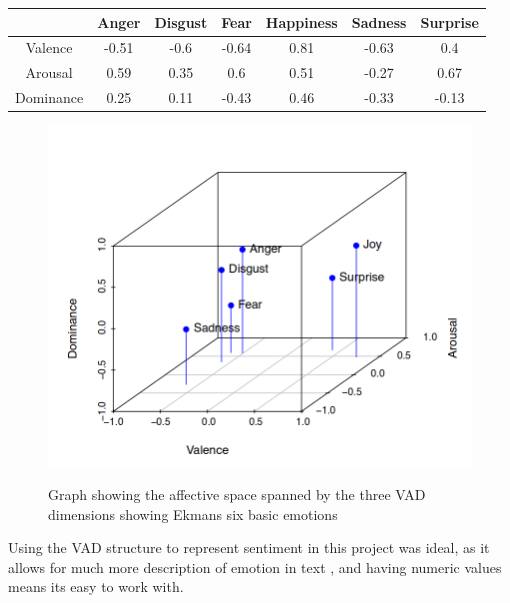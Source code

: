 \begin{center}
\begin{tabular}{ |c|c|c|c|c|c|c| } 
 \hline
  & Anger & Disgust & Fear & Happiness & Sadness & Surprise \\ 
 \hline                        
 Valence & -0.51 & -0.6 & -0.64 & 0.81 & -0.63 & 0.4\\ 
 Arousal & 0.59 & 0.35 & 0.6 & 0.51 & -0.27 & 0.67\\ 
 Dominance & 0.25 & 0.11 & -0.43 & 0.46 & -0.33 & -0.13\\ 
 \hline
\end{tabular}
\end{center}

\begin{figure}[h]
\caption{Graph showing the affective space spanned by the three VAD dimensions showing Ekmans six basic emotions \cite{VADMapping}}
\centering
\includegraphics[scale=0.2]{./LitReview/images/VAD_Ekman.png}
\label{ekmans:graph}
\end{figure}

Using the VAD structure to represent sentiment in this project was ideal, as it allows for much more description of emotion in text \cite{emotionPerspective}, and having numeric values means its easy to work with.
